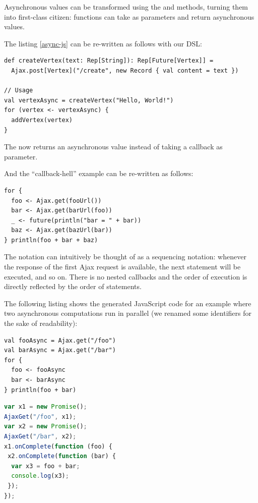 \documentclass[american,english,runningheads]{llncs}
\begin{document}
Asynchronous values can be transformed using the  and  methods, turning them into first-class citizen: functions can take as parameters and return asynchronous values.

The listing \ref{async-js} can be re-written as follows with our DSL:

\begin{lstlisting}
def createVertex(text: Rep[String]): Rep[Future[Vertex]] =
  Ajax.post[Vertex]("/create", new Record { val content = text })

// Usage
val vertexAsync = createVertex("Hello, World!")
for (vertex <- vertexAsync) {
  addVertex(vertex)
}
\end{lstlisting}

The  now returns an asynchronous value instead of taking a callback as parameter.

And the “callback-hell” example can be re-written as follows:

\begin{lstlisting}
for {
  foo <- Ajax.get(fooUrl())
  bar <- Ajax.get(barUrl(foo))
  _ <- future(println("bar = " + bar))
  baz <- Ajax.get(bazUrl(bar))
} println(foo + bar + baz)
\end{lstlisting}

The  notation can intuitively be thought of as a sequencing notation: whenever the response of the first Ajax request is available, the next statement will be executed, and so on. There is no nested callbacks and the order of execution is directly reflected by the order of statements.

The following listing shows the generated JavaScript code for an example where two asynchronous computations run in parallel (we renamed some identifiers for the sake of readability):

\begin{multicols}{2}
\begin{lstlisting}
val fooAsync = Ajax.get("/foo")
val barAsync = Ajax.get("/bar")
for {
  foo <- fooAsync
  bar <- barAsync
} println(foo + bar)
\end{lstlisting}
\vfill
\columnbreak
\begin{lstlisting}[language=JavaScript]
var x1 = new Promise();
AjaxGet("/foo", x1);
var x2 = new Promise();
AjaxGet("/bar", x2);
x1.onComplete(function (foo) {
 x2.onComplete(function (bar) {
  var x3 = foo + bar;
  console.log(x3);
 });
});
\end{lstlisting}
\end{multicols}
\end{document}
